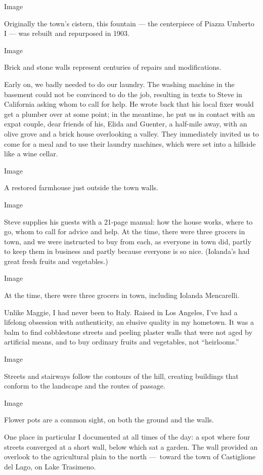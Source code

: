 Image

Originally the town's cistern, this fountain --- the centerpiece of
Piazza Umberto I --- was rebuilt and repurposed in 1903.

Image

Brick and stone walls represent centuries of repairs and modifications.

Early on, we badly needed to do our laundry. The washing machine in the
basement could not be convinced to do the job, resulting in texts to
Steve in California asking whom to call for help. He wrote back that his
local fixer would get a plumber over at some point; in the meantime, he
put us in contact with an expat couple, dear friends of his, Elida and
Guenter, a half-mile away, with an olive grove and a brick house
overlooking a valley. They immediately invited us to come for a meal and
to use their laundry machines, which were set into a hillside like a
wine cellar.

Image

A restored farmhouse just outside the town walls.

Image

Steve supplies his guests with a 21-page manual: how the house works,
where to go, whom to call for advice and help. At the time, there were
three grocers in town, and we were instructed to buy from each, as
everyone in town did, partly to keep them in business and partly because
everyone is so nice. (Iolanda's had great fresh fruits and vegetables.)

Image

At the time, there were three grocers in town, including Iolanda
Mencarelli.

Unlike Maggie, I had never been to Italy. Raised in Los Angeles, I've
had a lifelong obsession with authenticity, an elusive quality in my
hometown. It was a balm to find cobblestone streets and peeling plaster
walls that were not aged by artificial means, and to buy ordinary fruits
and vegetables, not ``heirlooms.''

Image

Streets and stairways follow the contours of the hill, creating
buildings that conform to the landscape and the routes of passage.

Image

Flower pots are a common sight, on both the ground and the walls.

One place in particular I documented at all times of the day: a spot
where four streets converged at a short wall, below which sat a garden.
The wall provided an overlook to the agricultural plain to the north
---~toward the town of Castiglione del Lago, on Lake Trasimeno.


